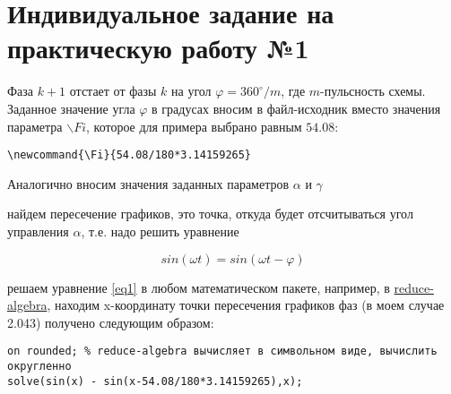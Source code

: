 \renewcommand{\ESKDtheTitleFieldX}{%
Санкт-Петербург

\ESKDtheYear~г.} %




\maketitle

\section{Индивидуальное задание на практическую работу №1}

\newcommand{\PI}{3.14159265}
\newcommand{\Fi}{54.08/180*3.14159265} %

Фаза $k+1$ отстает от фазы $k$ на угол $\varphi=360^\circ/m$, где $m$-пульсность схемы. Заданное значение угла $\varphi$ в градусах вносим в файл-исходник 
вместо значения параметра $\backslash Fi$, которое для примера выбрано равным $54.08$:

\begin{verbatim}
\newcommand{\Fi}{54.08/180*3.14159265}
\end{verbatim}

Аналогично вносим значения заданных параметров $\alpha$ и $\gamma$ 
\newcommand{\alfa}{0.524}  %
\newcommand{\gammaa}{0.698} %


найдем пересечение графиков, это точка, откуда будет отсчитываться угол управления $\alpha$, т.е. надо решить уравнение

\begin{equation} %
sin(\omega t) = sin(\omega t - \varphi)
	\label{eq1}
\end{equation}   %



решаем уравнение \ref{eq1} в любом математическом пакете, например, в \href{http://www.reduce-algebra.com/obtaining.php}{reduce-algebra}, 
находим  x-координату точки пересечения графиков фаз (в моем случае 2.043) получено следующим образом:
{\small
\begin{verbatim}
on rounded; % reduce-algebra вычисляет в символьном виде, вычислить округленно
solve(sin(x) - sin(x-54.08/180*3.14159265),x);
\end{verbatim}
}


